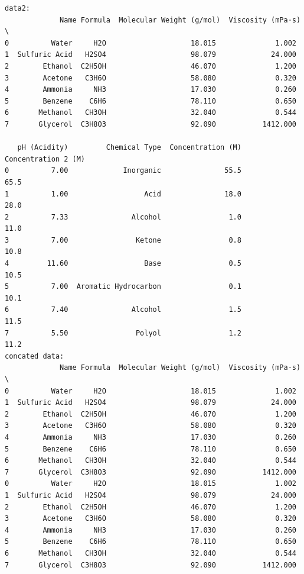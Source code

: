\documentclass[
  letterpaper,
  DIV=11,
  numbers=noendperiod]{scrreprt}
\begin{document}
\begin{verbatim}
data2: 
             Name Formula  Molecular Weight (g/mol)  Viscosity (mPa·s)  \
0          Water     H2O                    18.015              1.002   
1  Sulfuric Acid   H2SO4                    98.079             24.000   
2        Ethanol  C2H5OH                    46.070              1.200   
3        Acetone   C3H6O                    58.080              0.320   
4        Ammonia     NH3                    17.030              0.260   
5        Benzene    C6H6                    78.110              0.650   
6       Methanol   CH3OH                    32.040              0.544   
7       Glycerol  C3H8O3                    92.090           1412.000   

   pH (Acidity)         Chemical Type  Concentration (M)  Concentration 2 (M)  
0          7.00             Inorganic               55.5                 65.5  
1          1.00                  Acid               18.0                 28.0  
2          7.33               Alcohol                1.0                 11.0  
3          7.00                Ketone                0.8                 10.8  
4         11.60                  Base                0.5                 10.5  
5          7.00  Aromatic Hydrocarbon                0.1                 10.1  
6          7.40               Alcohol                1.5                 11.5  
7          5.50                Polyol                1.2                 11.2  
concated data: 
             Name Formula  Molecular Weight (g/mol)  Viscosity (mPa·s)  \
0          Water     H2O                    18.015              1.002   
1  Sulfuric Acid   H2SO4                    98.079             24.000   
2        Ethanol  C2H5OH                    46.070              1.200   
3        Acetone   C3H6O                    58.080              0.320   
4        Ammonia     NH3                    17.030              0.260   
5        Benzene    C6H6                    78.110              0.650   
6       Methanol   CH3OH                    32.040              0.544   
7       Glycerol  C3H8O3                    92.090           1412.000   
0          Water     H2O                    18.015              1.002   
1  Sulfuric Acid   H2SO4                    98.079             24.000   
2        Ethanol  C2H5OH                    46.070              1.200   
3        Acetone   C3H6O                    58.080              0.320   
4        Ammonia     NH3                    17.030              0.260   
5        Benzene    C6H6                    78.110              0.650   
6       Methanol   CH3OH                    32.040              0.544   
7       Glycerol  C3H8O3                    92.090           1412.000   


\end{verbatim}
\end{document}

